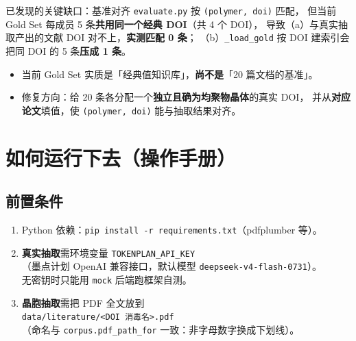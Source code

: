 \documentclass[11pt,a4paper]{ctexart}
\begin{document}
\begin{warnbox}{已发现的关键缺口：基准对齐}
\texttt{evaluate.py} 按 \texttt{(polymer, doi)} 匹配，
但当前 Gold Set 每成员 5 条\textbf{共用同一个经典 DOI}（共 4 个 DOI），
导致（a）与真实抽取产出的文献 DOI 对不上，\textbf{实测匹配 0 条}；
（b）\texttt{\_load\_gold} 按 DOI 建索引会把同 DOI 的 5 条\textbf{压成 1 条}。
\begin{itemize}
  \item 当前 Gold Set 实质是「经典值知识库」，\textbf{尚不是}「20 篇文档的基准」。
  \item 修复方向：给 20 条各分配一个\textbf{独立且确为均聚物晶体}的真实 DOI，
        并从\textbf{对应论文}填值，使 \texttt{(polymer, doi)} 能与抽取结果对齐。
\end{itemize}
\end{warnbox}

\section{如何运行下去（操作手册）}

\subsection{前置条件}
\begin{enumerate}[leftmargin=1.6em]
  \item Python 依赖：\texttt{pip install -r requirements.txt}（pdfplumber 等）。
  \item \textbf{真实抽取}需环境变量 \texttt{TOKENPLAN\_API\_KEY}\\
        （墨点计划 OpenAI 兼容接口，默认模型 \texttt{deepseek-v4-flash-0731}）。\\
        无密钥时只能用 \texttt{mock} 后端跑框架自测。
  \item \textbf{晶胞抽取}需把 PDF 全文放到\\
        \texttt{data/literature/<DOI~消毒名>.pdf}\\
        （命名与 \texttt{corpus.pdf\_path\_for} 一致：非字母数字换成下划线）。
\end{enumerate}
\end{document}
